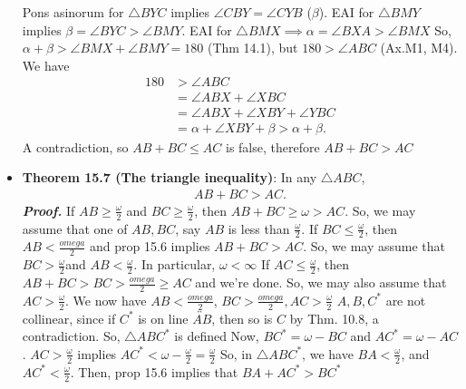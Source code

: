 \documentclass{report}
\begin{document}
\begin{itemize}
            \bigbreak \noindent 
            Pons asinorum for $\triangle BYC$ implies $ \angle CBY  = \angle CYB$ ($\beta$). EAI for $\triangle BMY$ implies $ \beta = \angle BYC > \angle BMY$. EAI for $ \triangle BMX \implies \alpha = \angle BXA > \angle BMX $
            \bigbreak \noindent 
            So, $ \alpha + \beta > \angle BMX + \angle BMY = 180 $ (Thm 14.1), but $180 > \angle ABC$ (Ax.M1, M4). We have
            \begin{align*}
                180 &> \angle ABC \\
                    &= \angle ABX + \angle XBC \\
                    &= \angle ABX + \angle XBY + \angle YBC \\
                    &= \alpha + \angle XBY + \beta > \alpha +\beta
            .\end{align*}
            A contradiction, so $ AB  + BC \leq AC$ is false, therefore $AB + BC > AC $
        \item \textbf{Theorem 15.7 (The triangle inequality)}: In any $\triangle ABC$, 
            \begin{align*}
                AB + BC > AC
            .\end{align*}
            \bigbreak \noindent 
            \textbf{\textit{Proof.}} If $AB \geq \frac{\omega}{2}$ and $ BC   \geq \frac{\omega}{2}$, then $AB + BC \geq \omega > AC$. So, we may assume that one of $AB,BC$, say $AB$ is less than $\frac{\omega}{2}$.
            \bigbreak \noindent 
            If $ BC \leq \frac{\omega}{2}$, then $ AB < \frac{omega}{2} $ and prop 15.6 implies $ AB + BC  > AC $. So, we may assume that $BC > \frac{\omega}{2}$and $ AB < \frac{\omega}{2}$. In particular, $\omega < \infty$
            \bigbreak \noindent 
            If $AC \leq \frac{\omega}{2}$, then $AB + BC > BC > \frac{omega}{2} \geq AC$ and we're done. So, we may also assume that $AC > \frac{\omega}{2}$. We now have $AB < \frac{omega}{2} $, $BC > \frac{omega}{2}, AC > \frac{\omega}{2}$
            \bigbreak \noindent 
            $A,B,C^{*}$ are not collinear, since if $ C^{*}$ is on line $ \overleftrightarrow{AB} $, then so is $C$ by Thm. 10.8, a contradiction. So, $\triangle ABC^{*} $ is defined
            \bigbreak \noindent 
            Now, $BC^{*} = \omega - BC$ and $AC^{*} = \omega - AC$. $AC > \frac{\omega}{2} $ implies $AC^{*} < \omega - \frac{\omega}{2} = \frac{\omega}{2} $
            \bigbreak \noindent 
            So, in $\triangle ABC^{*}$, we have $BA < \frac{\omega}{2}$, and $AC^{*} < \frac{\omega}{2}$. Then, prop 15.6 implies that $BA + AC^{*} > BC^{*}$

\end{itemize}
\end{document}

